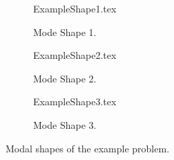 \begin{figure}
	\def\cs{.3}	
	
\begin{subfigure}{\cs\textwidth}
	\centering
	\def\width{\linewidth}
	\def\height{\linewidth}
	{ExampleShape1.tex}
	\caption{Mode Shape 1.}
	\label{fig:ExampleShape1}
\end{subfigure}
\begin{subfigure}{\cs\textwidth}
	\centering
	\def\width{\linewidth+1em}
	\def\height{\linewidth}
	{ExampleShape2.tex}
	\caption{Mode Shape 2.}
	\label{fig:ExampleShape2}
\end{subfigure}
\begin{subfigure}{\cs\textwidth}
	\centering
	\def\width{\linewidth}
	\def\height{\linewidth}
	{ExampleShape3.tex}
	\caption{Mode Shape 3.}
	\label{fig:ExampleShape3}
\end{subfigure}
\caption{Modal shapes of the example problem.}\label{fig:ExampleShape}
\end{figure}
